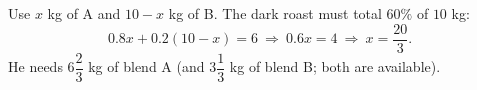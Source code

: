 Use $x$ kg of A and $10-x$ kg of B. The dark roast must total $60\%$ of $10$ kg:
\[
0.8x+0.2(10-x)=6\ \Longrightarrow\ 0.6x=4\ \Longrightarrow\ x=\dfrac{20}{3}.
\]
He needs $\boxed{6\dfrac{2}{3}}$ kg of blend A (and $3\dfrac{1}{3}$ kg of blend B; both are available).
